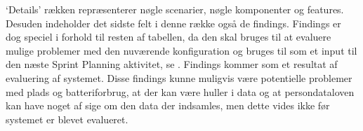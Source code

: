`Details' rækken repræsenterer nøgle scenarier, nøgle komponenter og features.
Desuden indeholder det sidste felt i denne række også de findings.
Findings er dog speciel i forhold til resten af tabellen, da den skal bruges til at evaluere mulige problemer med den nuværende konfiguration og bruges til som et input til den næste Sprint Planning aktivitet, se \citet[Afsnit 8.5, Side 54]{art:essence}. 
Findings kommer som et resultat af evaluering af systemet. 
Disse findings kunne muligvis være potentielle problemer med plads og batteriforbrug, at der kan være huller i data og at persondataloven kan have noget af sige om den data der indsamles, men dette vides ikke før systemet er blevet evalueret. 